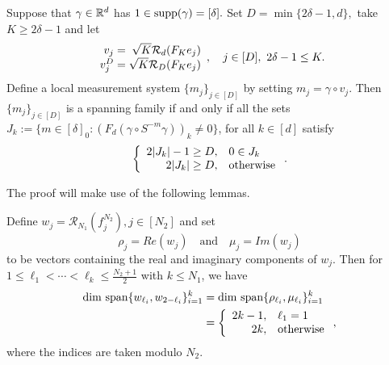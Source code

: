 
\begin{proposition}
  Suppose that $\gamma \in \mathbb{R}^d$ has $1 \in \operatorname{supp}(\gamma) = [\delta].$  Set $D = \min\{2 \delta - 1, d\},$ take $K \ge 2 \delta - 1$ and let \[\begin{array}{r@{\;=\;}r}v_j & \sqrt{K} \mathcal{R}_d(F_K e_j) \\ v_j^D & \sqrt{K} \mathcal{R}_D(F_K e_j) \end{array},\quad j \in [D],\  2 \delta - 1 \le K.\]  Define a local measurement system  $\{m_j\}_{j \in [D]}$ by setting $m_j = \gamma \circ v_j$.  Then $\{m_j\}_{j \in [D]}$ is a spanning family if and only if all the sets $J_k := \{m \in [\delta]_0 : (F_d (\gamma \circ S^{-m} \gamma))_k \neq 0\}$, for all $k \in [d]$ satisfy \[\left\{\begin{array}{r@{,\quad}l} 2 |J_k| - 1 \ge D & 0 \in J_k \\ 2 |J_k| \ge D & \text{otherwise}\end{array}\right..\] \label{prop:spanning_family}
\end{proposition}


The proof will make use of the following lemmas.

\begin{lemma}
  Define $w_j = \mathcal{R}_{N_1}(f_j^{N_2}), j \in [N_2]$ and set \[\rho_j = Re(w_j) \quad\text{and}\quad \mu_j = Im(w_j)\] to be vectors containing the real and imaginary components of $w_j$.  Then for $1 \le \ell_1 < \cdots < \ell_k \le \frac{N_2 + 1}{2}$ with $k \le N_1$, we have \begin{align*} \dim\,\Span\{w_{\ell_i}, w_{2 - \ell_i}\}_{i = 1}^k &= \dim\,\Span\{\rho_{\ell_i}, \mu_{\ell_i}\}_{i = 1}^k \\ &= \left\{\begin{array}{r@{,\quad}l} 2k - 1 & \ell_1 = 1 \\ 2k & \text{otherwise}\end{array}\right.,\end{align*} where the indices are taken modulo $N_2$. \label{lem:conjugate_span_dim}
\end{lemma}

